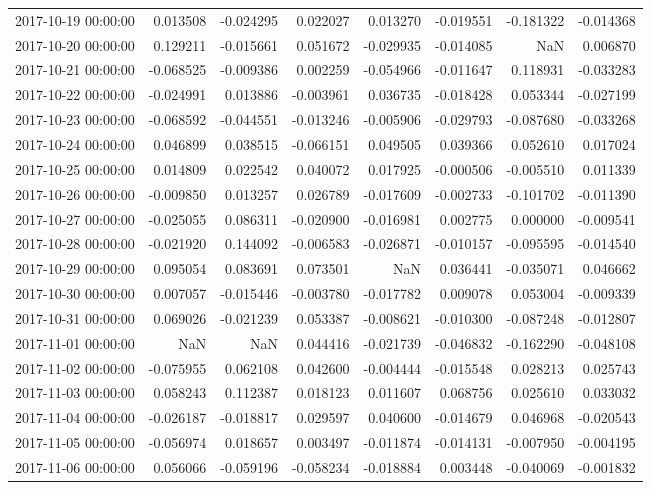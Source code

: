 \begin{tabular}{lrrrrrrr}
2017-10-19 00:00:00 & 0.013508 & -0.024295 & 0.022027 & 0.013270 & -0.019551 & -0.181322 & -0.014368 \\
2017-10-20 00:00:00 & 0.129211 & -0.015661 & 0.051672 & -0.029935 & -0.014085 & NaN & 0.006870 \\
2017-10-21 00:00:00 & -0.068525 & -0.009386 & 0.002259 & -0.054966 & -0.011647 & 0.118931 & -0.033283 \\
2017-10-22 00:00:00 & -0.024991 & 0.013886 & -0.003961 & 0.036735 & -0.018428 & 0.053344 & -0.027199 \\
2017-10-23 00:00:00 & -0.068592 & -0.044551 & -0.013246 & -0.005906 & -0.029793 & -0.087680 & -0.033268 \\
2017-10-24 00:00:00 & 0.046899 & 0.038515 & -0.066151 & 0.049505 & 0.039366 & 0.052610 & 0.017024 \\
2017-10-25 00:00:00 & 0.014809 & 0.022542 & 0.040072 & 0.017925 & -0.000506 & -0.005510 & 0.011339 \\
2017-10-26 00:00:00 & -0.009850 & 0.013257 & 0.026789 & -0.017609 & -0.002733 & -0.101702 & -0.011390 \\
2017-10-27 00:00:00 & -0.025055 & 0.086311 & -0.020900 & -0.016981 & 0.002775 & 0.000000 & -0.009541 \\
2017-10-28 00:00:00 & -0.021920 & 0.144092 & -0.006583 & -0.026871 & -0.010157 & -0.095595 & -0.014540 \\
2017-10-29 00:00:00 & 0.095054 & 0.083691 & 0.073501 & NaN & 0.036441 & -0.035071 & 0.046662 \\
2017-10-30 00:00:00 & 0.007057 & -0.015446 & -0.003780 & -0.017782 & 0.009078 & 0.053004 & -0.009339 \\
2017-10-31 00:00:00 & 0.069026 & -0.021239 & 0.053387 & -0.008621 & -0.010300 & -0.087248 & -0.012807 \\
2017-11-01 00:00:00 & NaN & NaN & 0.044416 & -0.021739 & -0.046832 & -0.162290 & -0.048108 \\
2017-11-02 00:00:00 & -0.075955 & 0.062108 & 0.042600 & -0.004444 & -0.015548 & 0.028213 & 0.025743 \\
2017-11-03 00:00:00 & 0.058243 & 0.112387 & 0.018123 & 0.011607 & 0.068756 & 0.025610 & 0.033032 \\
2017-11-04 00:00:00 & -0.026187 & -0.018817 & 0.029597 & 0.040600 & -0.014679 & 0.046968 & -0.020543 \\
2017-11-05 00:00:00 & -0.056974 & 0.018657 & 0.003497 & -0.011874 & -0.014131 & -0.007950 & -0.004195 \\
2017-11-06 00:00:00 & 0.056066 & -0.059196 & -0.058234 & -0.018884 & 0.003448 & -0.040069 & -0.001832 \\

\end{tabular}
